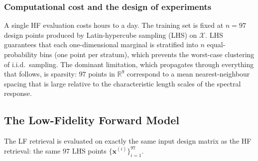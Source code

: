 \documentclass[11pt,a4paper]{article}
\newcommand{\thref}[1]{{\color{teal}\textit{Thesis: #1}}}
\newcommand{\litref}[1]{{\color{violet}\textit{See: #1}}}
\newcommand{\xv}{\bm{x}}
\newcommand{\yhf}{y^{\mathrm{HF}}}
\newcommand{\ylf}{y^{\mathrm{LF}}}
\begin{document}
\subsubsection{Computational cost and the design of experiments}
A single HF evaluation costs hours to a day. The training set is fixed
at $n = 97$ design points produced by Latin-hypercube sampling (LHS) on
$\mathcal{X}$. LHS guarantees that each one-dimensional marginal is
stratified into $n$ equal-probability bins (one point per stratum),
which prevents the worst-case clustering of i.i.d.\ sampling. The
dominant limitation, which propagates through everything that follows,
is sparsity: $97$ points in $\mathbb{R}^{9}$ correspond to a mean
nearest-neighbour spacing that is large relative to the characteristic
length scales of the spectral response.\\

\subsection{The Low-Fidelity Forward Model}
The LF retrieval is evaluated on exactly the same input design
matrix as the HF retrieval: the same $97$ LHS points
$\{\xv^{(i)}\}_{i=1}^{97}$. 
\end{document}
